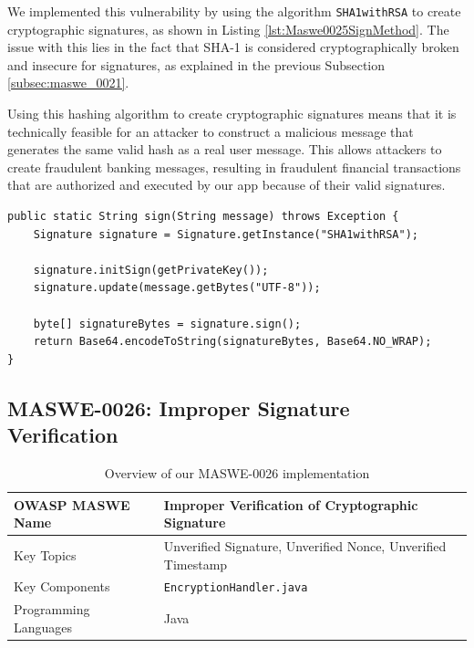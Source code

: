 \vspace{-20pt}

We implemented this vulnerability by using the algorithm \texttt{SHA1withRSA} to create cryptographic signatures, as shown in Listing \ref{lst:Maswe0025SignMethod}. The issue with this lies in the fact that SHA-1 is considered cryptographically broken and insecure for signatures, as explained in the previous Subsection \ref{subsec:maswe_0021}. 

Using this hashing algorithm to create cryptographic signatures means that it is technically feasible for an attacker to construct a malicious message that generates the same valid hash as a real user message. This allows attackers to create fraudulent banking messages, resulting in fraudulent financial transactions that are authorized and executed by our app because of their valid signatures.

\vspace{-1pt}

\begin{lstlisting}[style=JavaStyle, float=tbh, captionpos=b, caption={Creating cryptographic signatures using \texttt{SHA1withRSA}}, label={lst:Maswe0025SignMethod}]
public static String sign(String message) throws Exception {
    Signature signature = Signature.getInstance("SHA1withRSA");
    
    signature.initSign(getPrivateKey());
    signature.update(message.getBytes("UTF-8"));
    
    byte[] signatureBytes = signature.sign();
    return Base64.encodeToString(signatureBytes, Base64.NO_WRAP);
}
\end{lstlisting}


\subsection{MASWE-0026: Improper Signature Verification}
\label{subsec:maswe-0026}

\begin{table}[H]
    \centering
    \renewcommand{\arraystretch}{1.3}
        \begin{tabular}{p{5cm} p{8cm}} 
        \toprule
        OWASP MASWE Name & Improper Verification of Cryptographic Signature \\ 
        \midrule
        Key Topics & Unverified Signature, Unverified Nonce, Unverified Timestamp \\
        Key Components & \texttt{EncryptionHandler.java} \\
        Programming Languages & Java \\ 
        \bottomrule
        \end{tabular}
    \caption{Overview of our MASWE-0026 implementation}
    \label{tab:maswe-0026}
\end{table}

